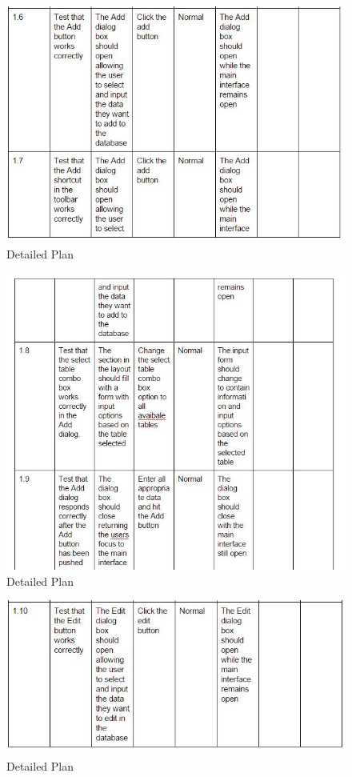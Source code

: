\begin{itemize}
\begin{figure}[H]
    \includegraphics[width=\textwidth]{DP4.JPG}
    \caption{Detailed Plan} \label{fig:VDetailed Plan}
\end{figure}

\begin{figure}[H]
    \includegraphics[width=\textwidth]{DP5.JPG}
    \caption{Detailed Plan} \label{fig:VDetailed Plan}
\end{figure}

\begin{figure}[H]
    \includegraphics[width=\textwidth]{DP6.JPG}
    \caption{Detailed Plan} \label{fig:VDetailed Plan}
\end{figure}


\end{itemize}
